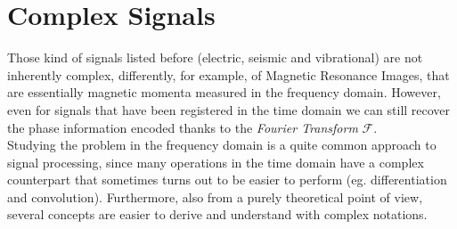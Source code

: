 
\section{Complex Signals}
Those kind of signals listed before (electric, seismic and vibrational) are not inherently complex, differently, for example, of Magnetic Resonance Images, that are essentially magnetic momenta measured in the frequency domain. However, even for signals that have been registered in the time domain we can still recover the phase information encoded thanks to the \textit{Fourier Transform} $\mathcal{F}$.\\
Studying the problem in the frequency domain is a quite common approach to signal processing, since many operations in the time domain have a complex counterpart that sometimes turns out to be easier to perform (eg. differentiation and convolution). Furthermore, also from a purely theoretical point of view, several concepts are easier to derive and understand with complex notations. 	

